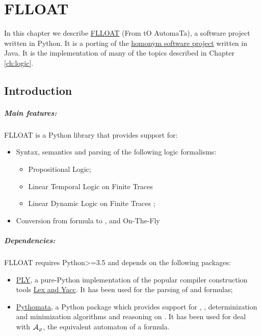 \chapter{FLLOAT}\label{ch:flloat}
In this chapter we describe \href{https://github.com/MarcoFavorito/flloat.git}{FLLOAT} (From \LLf tO AutomaTa), a software project written in Python. It is a porting of the \href{https://github.com/RiccardoDeMasellis/FLLOAT}{homonym software project} written in Java. It is the implementation of many of the topics described in Chapter \ref{ch:logic}. 


\section{Introduction}
\paragraph{Main features:} FLLOAT is a Python library that provides support for:
\begin{itemize}
	
	\item Syntax, semantics and parsing of the following logic formalisms:
	\begin{itemize}
		\item Propositional Logic;
		\item Linear Temporal Logic on Finite Traces \LTLf
		\item Linear Dynamic Logic on Finite Traces \LDLf;
	\end{itemize}
	\item Conversion from \LLf formula to \NFA, \DFA and \DFA On-The-Fly
	
\end{itemize}

\paragraph{Dependencies:} FLLOAT requires Python>=3.5 and depends on the following packages:
\begin{itemize}
	\item \href{http://www.dabeaz.com/ply/ply.html}{PLY}, a pure-Python implementation of the popular compiler construction tools \href{http://dinosaur.compilertools.net/}{Lex and Yacc}. It has been used for the parsing of \PL and \LLf formulas;
	\item \href{https://github.com/MarcoFavorito/pythomata}{Pythomata}, a Python package which provides support for \NFA, \DFA, determinization and minimization algorithms and reasoning on \DFAs. It has been used for deal with $\mathcal{A}_\varphi$, the equivalent automaton of a \LLf formula.
\end{itemize}

